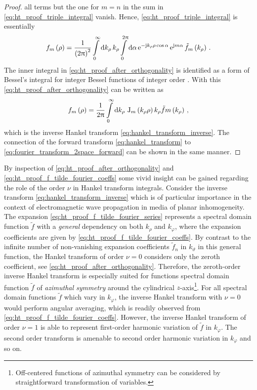 \begin{proof}
	all terms but the one for $m = n$ in the sum in
	\eqref{eq:ht_proof_triple_integral} vanish.
	Hence, \eqref{eq:ht_proof_triple_integral} is essentially
	\begin{equation}\label{eq:ht_proof_after_orthogonality}
		f_m \left(\rho\right) = 
		\frac{1}{\left(2\uppi\right)^2}
		\int\limits_{0}^{\infty} \mathrm{d} k_\rho \, k_\rho
		\int\limits_{0}^{2\uppi} \mathrm{d} \alpha \,
		\mathrm{e}^{-\mathrm{j} k_\rho \rho \cos \alpha}\,
		\mathrm{e}^{\mathrm{j} m \alpha}\,
		\tilde{f}_m \left(k_\rho\right)
		\, .
	\end{equation}
	The inner integral in \eqref{eq:ht_proof_after_orthogonality} is identified
	as a form of Bessel's integral \cite[(10.19.2)]{Olver2010} for integer
	Bessel functions of integer order \cite[p.~314]{Davies2002}.
	With this \eqref{eq:ht_proof_after_orthogonality} can be written as
	\begin{equation}
		f_m \left(\rho\right) =
		\frac{1}{2\uppi}
		\int\limits_{0}^{\infty} \mathrm{d} k_\rho \,
		\operatorname{J}_{m}\left(k_\rho \rho\right) k_\rho
		\tilde{f}m \left(k_\rho\right)
		\, ,
	\end{equation}
	which is the inverse Hankel transform \eqref{eq:hankel_transform_inverse}.
	The connection of the forward transform \eqref{eq:hankel_transform}
	to \eqref{eq:fourier_transform_2space_forward} can be shown in the same
	manner.
\end{proof}

By inspection of \eqref{eq:ht_proof_after_orthogonality} and 
\eqref{eq:ht_proof_f_tilde_fourier_coeffs} some vivid insight can be gained
regarding the role of the order $\nu$ in Hankel transform integrals. 
Consider the inverse transform \eqref{eq:hankel_transform_inverse} which
is of particular importance in the context of electromagnetic wave propagation
in media of planar inhomogeneity.
The expansion \eqref{eq:ht_proof_f_tilde_fourier_series} represents a
spectral domain function $\tilde{f}$ with a \emph{general} dependency on both
$k_\rho$ and $k_\varphi$, where the expansion coefficients are given by
\eqref{eq:ht_proof_f_tilde_fourier_coeffs}.
By contrast to the infinite number of non-vanishing expansion coefficients
$\tilde{f}_n$ in $k_\vartheta$ in this general function, the Hankel transform
of order $\nu = 0$ considers only the zeroth coefficient,
see \eqref{eq:ht_proof_after_orthogonality}.
Therefore, the zeroth-order inverse Hankel transform is especially suited for
functions spectral domain function $\tilde{f}$ of
\emph{azimuthal symmetry} around the cylindrical
$z$-axis\footnote{Off-centered functions of azimuthal
symmetry can be considered by straightforward transformation of variables.}.
For all spectral domain functions $\tilde{f}$ which vary in $k_\varphi$, the
inverse Hankel transform with $\nu = 0$ would perform angular averaging, which
is readily observed from \eqref{eq:ht_proof_f_tilde_fourier_coeffs}.
However, the inverse Hankel transform of order $\nu = 1$ is able to represent
first-order harmonic variation of $\tilde{f}$ in $k_\varphi$.
The second order transform is amenable to second order harmonic variation in
$k_\varphi$ and so on.

